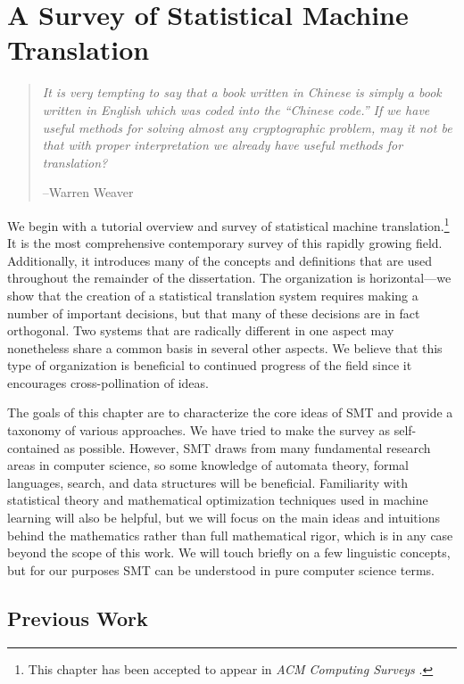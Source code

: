 \chapter{A Survey of Statistical Machine Translation}\label{chap:survey}

\begin{quote}
	{\em It is very tempting to say that a book written in Chinese is simply a 
	book written in English which was coded into the “Chinese code.” If we 
	have useful methods for solving almost any cryptographic problem, may it 
	not be that with proper interpretation we already have useful methods for 
	translation?}
	\begin{flushright}
		--Warren Weaver
	\end{flushright}
\end{quote}


We begin with a tutorial overview and survey of 
statistical machine translation.\footnote{This chapter has been accepted to appear in {\em ACM Computing Surveys} \citep{Lopez:2008:csur}.}  It is the most
comprehensive contemporary survey of this rapidly growing field.
Additionally, it introduces many of the concepts and definitions
that are used throughout the remainder of the dissertation.  The 
organization is horizontal---we show that the creation of a statistical
translation system requires making a number of important decisions, but 
that many of these decisions are in fact orthogonal.  Two
systems that are radically different in one aspect may nonetheless share
a common basis in several other aspects.  We believe that this type of
organization is beneficial to continued progress of the field since
it encourages cross-pollination of ideas.

The goals of this chapter are to characterize 
the core ideas of SMT and provide a taxonomy of  
various approaches.  We have tried to make the
survey as self-contained as possible.  
However, SMT draws from many
fundamental research areas in computer science, so some
knowledge of automata theory, formal languages, 
search, and data structures will be beneficial.
Familiarity with statistical theory
and mathematical optimization techniques used in 
machine learning will also be helpful,
but we will focus on the main ideas and intuitions 
behind the mathematics rather than 
full mathematical rigor, which
is in any case beyond the scope of this work.
We will touch briefly on a few linguistic concepts, 
but for our purposes SMT can be understood in
pure computer science terms.

\section{Previous Work}

